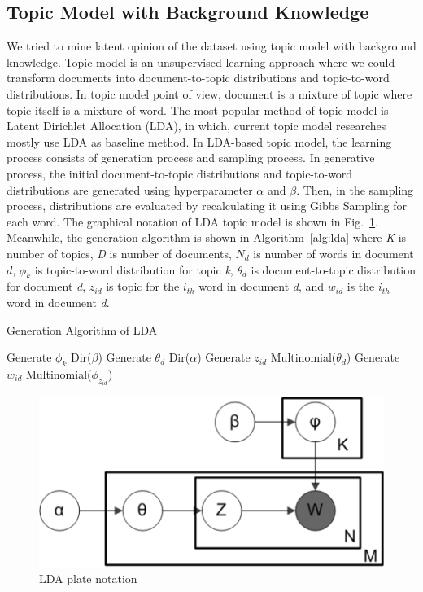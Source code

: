 \documentclass[10pt, conference, compsocconf]{IEEEtran}
\begin{document}
\subsection{Topic Model with Background Knowledge}
We tried to mine latent opinion of the dataset  using topic  model with background knowledge. Topic model is an unsupervised learning approach where we could transform documents into document-to-topic distributions and topic-to-word distributions. In topic model point of view, document is a mixture of topic where topic itself is a mixture of word. The most popular method of topic model is Latent Dirichlet Allocation (LDA)\cite{b8}, in which, current topic model researches mostly use LDA as baseline method. In LDA-based topic model, the learning process consists of generation process and sampling process. In generative process, the initial document-to-topic distributions and topic-to-word distributions are generated using hyperparameter $\alpha$ and $\beta$. Then, in the sampling process, distributions are evaluated by recalculating it using Gibbs Sampling for each word. The graphical notation of LDA topic model is shown in Fig.~\ref{fig_lda}. Meanwhile, the generation algorithm is shown in Algorithm~\ref{alg:lda} where {\it K} is number of topics, {\it D} is number of documents, $N_d$ is number of words in document $d$, $\phi_k$ is topic-to-word distribution for topic {\it k}, $\theta_d$ is document-to-topic distribution for document {\it d}, $z_{id}$ is topic for the $i_{th}$ word in document {\it d}, and $w_{id}$ is the $i_{th}$ word in document {\it d}.

\begin{algorithm}[b]
\caption{Generation Algorithm of LDA}
\label{alg:lda}
\begin{algorithmic}[1]
\STATE Generate $\phi_k$ \texttildelow{} Dir($\beta$) 
\ENDFOR
{}
\STATE Generate $\theta_d$ \texttildelow{} Dir($\alpha$) 
\ENDFOR
{}
\STATE Generate $z_{id}$ \texttildelow{} Multinomial($\theta_d$)
\STATE Generate $w_{id}$ \texttildelow{} Multinomial($\phi_{z_{id}}$)
\ENDFOR
\end{algorithmic}
\end{algorithm}

\begin{figure}[h]
	\includegraphics[scale=0.5]{lda.png}
	\caption{LDA plate notation}
\label{fig_lda}
\end{figure}
\end{document}

